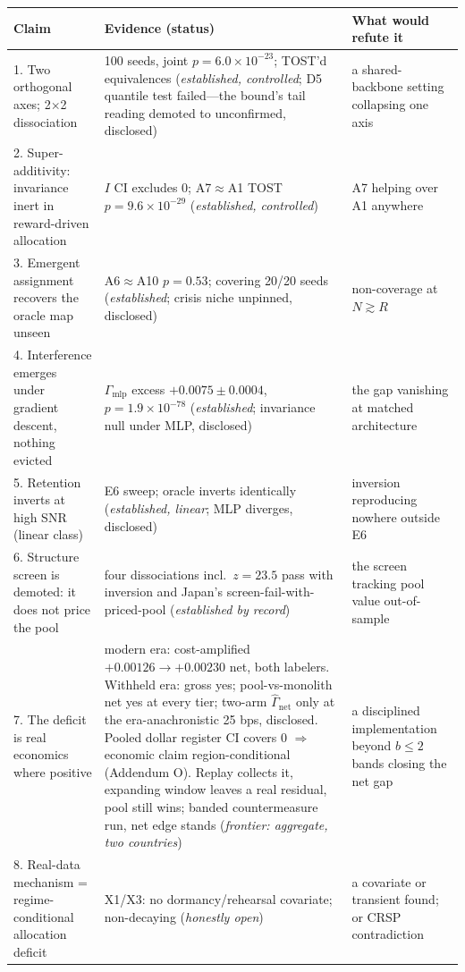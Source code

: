\documentclass{article}
\begin{document}
\begin{table}[h]
\centering
\scriptsize
\begin{tabular}{p{}p{}p{}}
\toprule
\textbf{Claim} & \textbf{Evidence (status)} & \textbf{What would refute it} \\
\midrule
1. Two orthogonal axes; 2$\times$2 dissociation & 100 seeds, joint $p{=}6.0{\times}10^{-23}$; TOST'd equivalences (\emph{established, controlled}; D5 quantile test failed---the bound's tail reading demoted to unconfirmed, disclosed) & a shared-backbone setting collapsing one axis \\
2. Super-additivity: invariance inert in reward-driven allocation & $I$ CI excludes 0; A7$\approx$A1 TOST $p{=}9.6{\times}10^{-29}$ (\emph{established, controlled}) & A7 helping over A1 anywhere \\
3. Emergent assignment recovers the oracle map unseen & A6$\approx$A10 $p{=}0.53$; covering 20/20 seeds (\emph{established}; crisis niche unpinned, disclosed) & non-coverage at $N \gtrsim R$ \\
4. Interference emerges under gradient descent, nothing evicted & $\Gamma_{\text{mlp}}$ excess $+0.0075\pm0.0004$, $p{=}1.9{\times}10^{-78}$ (\emph{established}; invariance null under MLP, disclosed) & the gap vanishing at matched architecture \\
5. Retention inverts at high SNR (linear class) & E6 sweep; oracle inverts identically (\emph{established, linear}; MLP diverges, disclosed) & inversion reproducing nowhere outside E6 \\
6. Structure screen is demoted: it does not price the pool & four dissociations incl.\ $z{=}23.5$ pass with inversion and Japan's screen-fail-with-priced-pool (\emph{established by record}) & the screen tracking pool value out-of-sample \\
7. The deficit is real economics where positive & modern era: cost-amplified $+0.00126 \to +0.00230$ net, both labelers. Withheld era: gross yes; pool-vs-monolith net yes at every tier; two-arm $\hat\Gamma_{\mathrm{net}}$ only at the era-anachronistic 25 bps, disclosed. Pooled dollar register CI covers 0 $\Rightarrow$ economic claim region-conditional (Addendum O). Replay collects it, expanding window leaves a real residual, pool still wins; banded countermeasure run, net edge stands (\emph{frontier: aggregate, two countries}) & a disciplined implementation beyond $b{\le}2$ bands closing the net gap \\
8. Real-data mechanism = regime-conditional allocation deficit & X1/X3: no dormancy/rehearsal covariate; non-decaying (\emph{honestly open}) & a covariate or transient found; or CRSP contradiction \\

\end{tabular}
\end{table}
\end{document}

